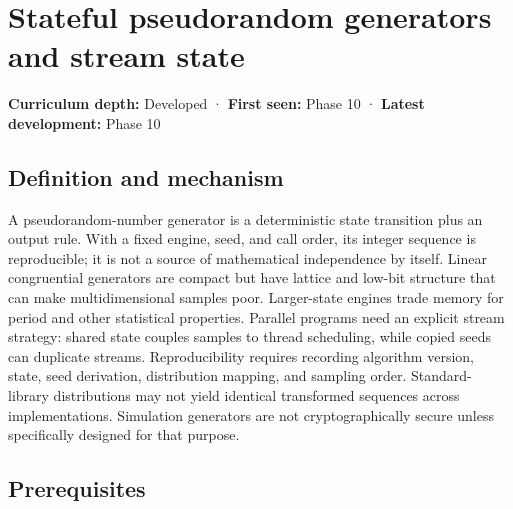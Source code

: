 \hypertarget{appendix-e0f7c7e08f3a}{}\label{referencestart:appendix-e0f7c7e08f3a}
\section{Stateful pseudorandom generators and stream state}\label{appendix-e0f7c7e08f3a-stateful-pseudorandom-generators-and-stream-state}

\hypertarget{appendix-e0f7c7e08f3a-stateful-pseudorandom-generators-and-stream-state}{}

\textbf{Curriculum depth:} Developed · \textbf{First seen:} Phase 10 · \textbf{Latest development:} Phase 10

\begin{allmightroledefinition}

\subsection{Definition and mechanism}\label{appendix-e0f7c7e08f3a-definition-and-mechanism}

\hypertarget{appendix-e0f7c7e08f3a-definition-and-mechanism}{}

A pseudorandom-number generator is a deterministic state transition plus an output rule. With a fixed engine, seed, and call order, its integer sequence is reproducible; it is not a source of mathematical independence by itself. Linear congruential generators are compact but have lattice and low-bit structure that can make multidimensional samples poor. Larger-state engines trade memory for period and other statistical properties. Parallel programs need an explicit stream strategy: shared state couples samples to thread scheduling, while copied seeds can duplicate streams. Reproducibility requires recording algorithm version, state, seed derivation, distribution mapping, and sampling order. Standard-library distributions may not yield identical transformed sequences across implementations. Simulation generators are not cryptographically secure unless specifically designed for that purpose.

\end{allmightroledefinition}

\subsection{Prerequisites}\label{appendix-e0f7c7e08f3a-prerequisites}

\hypertarget{appendix-e0f7c7e08f3a-prerequisites}{}

